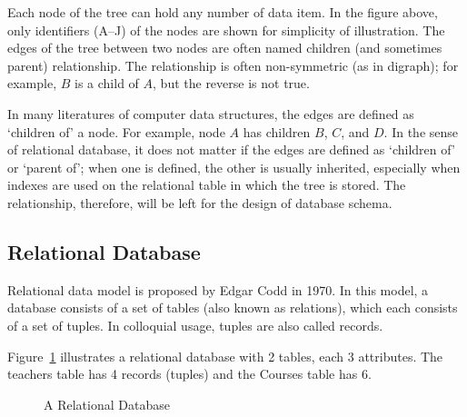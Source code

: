 Each node of the tree can hold any number of data item. In the figure above, only identifiers (A--J) of the nodes are shown for simplicity of illustration. The edges of the tree between two nodes are often named children (and sometimes parent) relationship. The relationship is often non-symmetric (as in digraph); for example, $B$ is a child of $A$, but the reverse is not true.

In many literatures of computer data structures, the edges are defined as `children of' a node. For example, node $A$ has children $B$, $C$, and $D$. In the sense of relational database, it does not matter if the edges are defined as `children of' or `parent of'; when one is defined, the other is usually inherited, especially when indexes are used on the relational table in which the tree is stored. The relationship, therefore, will be left for the design of database schema.

\subsection{Relational Database}

Relational data model is proposed by Edgar Codd in 1970\cite{DBLP:journals/cacm/Codd70}. In this model, a database consists of a set of tables (also known as relations), which each consists of a set of tuples. In colloquial usage, tuples are also called records.

Figure~\ref{fig:relational_database} illustrates a relational database with 2 tables, each 3 attributes. The teachers table has 4 records (tuples) and the Courses table has 6.

\begin{figure}[h]
\centering
{}
\caption{A Relational Database\label{fig:relational_database}}
\end{figure}

